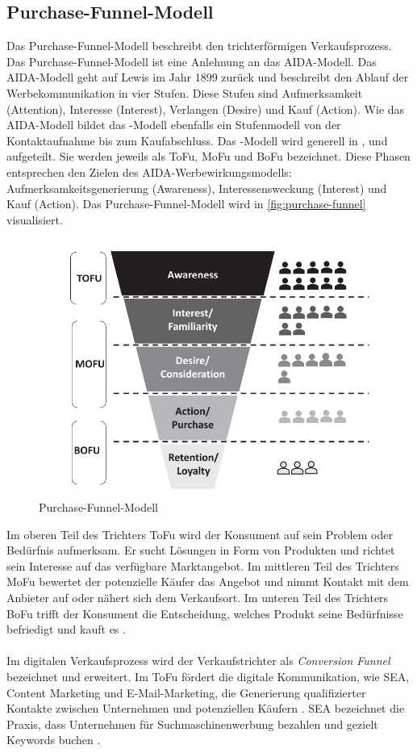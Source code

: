 \subsection{Purchase-Funnel-Modell}
\label{PurchaseFunnelModell}
Das Purchase-Funnel-Modell beschreibt den trichterförmigen Verkaufsprozess. Das Purchase-Funnel-Modell ist eine Anlehnung an das AIDA-Modell. Das AIDA-Modell geht auf Lewis im Jahr 1899 zurück und beschreibt den Ablauf der Werbekommunikation in vier Stufen. Diese Stufen sind Aufmerksamkeit (Attention), Interesse (Interest), Verlangen (Desire) und Kauf (Action). Wie das AIDA-Modell bildet das -Modell ebenfalls ein Stufenmodell von der Kontaktaufnahme bis zum Kaufabschluss. Das -Modell wird generell in ,  und  aufgeteilt. Sie werden jeweils als \ac{ToFu}, \ac{MoFu} und \ac{BoFu} bezeichnet. Diese Phasen entsprechen den Zielen des AIDA-Werbewirkungsmodells: Aufmerksamkeitsgenerierung (Awareness), Interessensweckung (Interest) und Kauf (Action). Das Purchase-Funnel-Modell wird in \autoref{fig:purchase-funnel} visualisiert.
\begin{figure}[H]
    \centering
    \includegraphics[width=0.75\linewidth]{images/Funnel.png}
    \caption{Purchase-Funnel-Modell \cite{Kleinjohann2024}}
    \label{fig:purchase-funnel}
\end{figure}
\noindent
Im oberen Teil des Trichters \ac{ToFu} wird der Konsument auf sein Problem oder Bedürfnis aufmerksam. Er sucht Lösungen in Form von Produkten und richtet sein Interesse auf das verfügbare Marktangebot. Im mittleren Teil des Trichters \ac{MoFu} bewertet der potenzielle Käufer das Angebot und nimmt Kontakt mit dem Anbieter auf oder nähert sich dem Verkaufsort. Im unteren Teil des Trichters \ac{BoFu} trifft der Konsument die Entscheidung, welches Produkt seine Bedürfnisse befriedigt und kauft es \cite{Kleinjohann2024}.\\\\
Im digitalen Verkaufsprozess wird der Verkaufstrichter als \textit{Conversion Funnel} bezeichnet und erweitert. Im \ac{ToFu} fördert die digitale Kommunikation, wie \ac{SEA}, Content Marketing und E-Mail-Marketing, die Generierung qualifizierter Kontakte zwischen Unternehmen und potenziellen Käufern \cite{Kleinjohann2024}. \ac{SEA} bezeichnet die Praxis, dass Unternehmen für Suchmaschinenwerbung bezahlen und gezielt Keywords buchen \cite{Bartholomew2005MakingAM}. 

